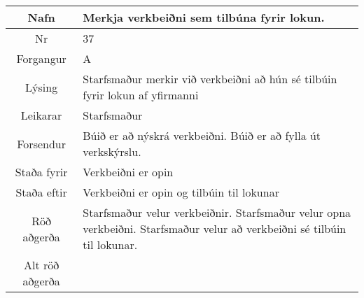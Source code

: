 \documentclass[a4paper]{article}
\begin{document}
\begin{tabular}{|c|p{10cm}|}
\hline
Nafn&Merkja verkbeiðni sem tilbúna fyrir lokun.\\
\hline
Nr&37\\
\hline
Forgangur&A\\
\hline
Lýsing&Starfsmaður merkir við verkbeiðni að hún sé tilbúin fyrir lokun af yfirmanni\\
\hline
Leikarar&Starfsmaður\\
\hline
Forsendur&Búið er að nýskrá verkbeiðni. Búið er að fylla út verkskýrslu.\\
\hline
Staða fyrir&Verkbeiðni er opin\\
\hline
Staða eftir&Verkbeiðni er opin og tilbúin til lokunar\\
\hline
Röð aðgerða&Starfsmaður velur verkbeiðnir. Starfsmaður velur opna verkbeiðni. Starfsmaður velur að verkbeiðni sé tilbúin til lokunar.\\
\hline
Alt röð aðgerða&\\
\hline
\end{tabular}
\end{document}
